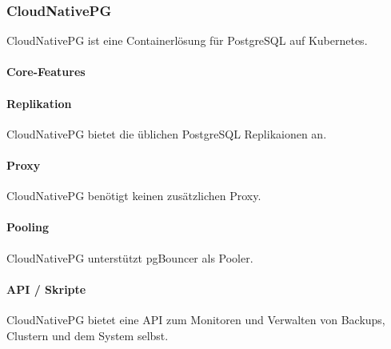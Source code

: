 
\begin{flushleft}
    \subsubsection{CloudNativePG}
    CloudNativePG ist eine Containerlösung für PostgreSQL auf Kubernetes.
\end{flushleft}
\begin{flushleft}
    \paragraph{Core-Features}

\end{flushleft}
\begin{flushleft}
    \paragraph{Replikation}
    CloudNativePG bietet die üblichen PostgreSQL Replikaionen an.
\end{flushleft}
\begin{flushleft}
    \paragraph{Proxy}
    CloudNativePG benötigt keinen zusätzlichen Proxy.
\end{flushleft}
\begin{flushleft}
    \paragraph{Pooling}
    CloudNativePG unterstützt pgBouncer als Pooler.
\end{flushleft}
\begin{flushleft}
    \paragraph{API / Skripte}
    CloudNativePG bietet eine API zum Monitoren und Verwalten von Backups, Clustern und dem System selbst\cite{L7PXKAUY}.
\end{flushleft}
